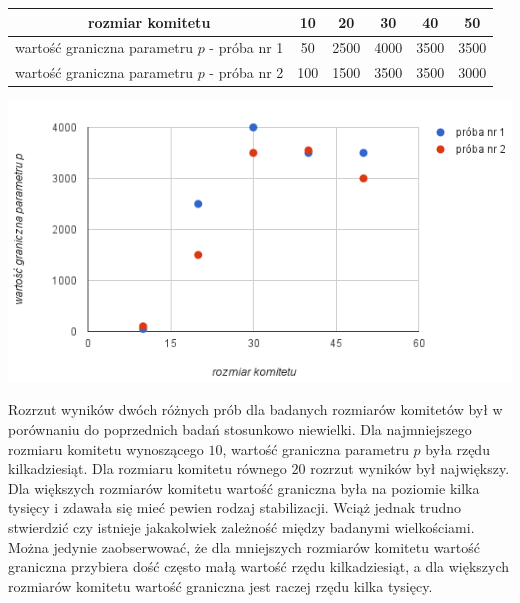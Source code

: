 \documentclass[pdflatex,11pt]{../aghdoc_version2}
\begin{document}
\begin{center}
\begin{tabular}{|c|c|c|c|c|c|}
   \hline 
   rozmiar komitetu & 10 & 20 & 30 & 40 & 50 \\ 
   \hline 
   wartość graniczna parametru $p$ - próba nr 1 & 50 & 2500 & 4000 & 3500 & 3500 \\ 
   \hline 
   wartość graniczna parametru $p$ - próba nr 2 & 100 & 1500 & 3500 & 3500 & 3000 \\ 
   \hline 
\end{tabular}    
\end{center}

\vspace{\baselineskip}

\begin{center}
\centerline{\includegraphics[scale=1]{pics/wartosc_graniczna_od_rozmiar_komitetu.png}}
\end{center}

Rozrzut wyników dwóch różnych prób dla badanych rozmiarów komitetów był w porównaniu do poprzednich badań stosunkowo niewielki. Dla najmniejszego rozmiaru komitetu wynoszącego $10$, wartość graniczna parametru $p$ była rzędu kilkadziesiąt. Dla rozmiaru komitetu równego $20$ rozrzut wyników był największy. Dla większych rozmiarów komitetu wartość graniczna była na poziomie kilka tysięcy i zdawała się mieć pewien rodzaj stabilizacji. Wciąż jednak trudno stwierdzić czy istnieje jakakolwiek zależność między badanymi wielkościami. Można jedynie zaobserwować, że dla mniejszych rozmiarów komitetu wartość graniczna przybiera dość często małą wartość rzędu kilkadziesiąt, a dla większych rozmiarów komitetu wartość graniczna jest raczej rzędu kilka tysięcy.
\end{document}
